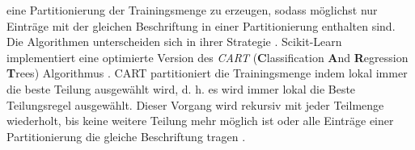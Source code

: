 eine Partitionierung der Trainingsmenge zu erzeugen, sodass möglichst nur Einträge mit der gleichen Beschriftung in einer Partitionierung enthalten sind. Die Algorithmen unterscheiden
sich in ihrer Strategie \cite{quinlan1986induction}.
\newline
\newline
Scikit-Learn implementiert eine optimierte Version des \textit{CART} (\textbf{C}lassification \textbf{A}nd \textbf{R}egression \textbf{T}rees) Algorithmus \cite{ScikitLearnCART}.
CART partitioniert die Trainingsmenge indem lokal immer die beste Teilung ausgewählt wird, d. h. es wird immer lokal die Beste Teilungsregel ausgewählt.
Dieser Vorgang wird rekursiv mit jeder Teilmenge wiederholt, bis keine weitere Teilung mehr möglich ist oder alle Einträge einer Partitionierung die gleiche Beschriftung tragen \cite{steinbergCART}.